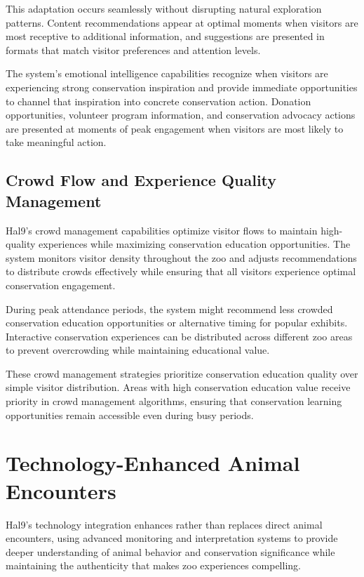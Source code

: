 \documentclass[
  Letterpaper,
]{scrbook}
\begin{document}
This adaptation occurs seamlessly without disrupting natural exploration
patterns. Content recommendations appear at optimal moments when
visitors are most receptive to additional information, and suggestions
are presented in formats that match visitor preferences and attention
levels.

The system's emotional intelligence capabilities recognize when visitors
are experiencing strong conservation inspiration and provide immediate
opportunities to channel that inspiration into concrete conservation
action. Donation opportunities, volunteer program information, and
conservation advocacy actions are presented at moments of peak
engagement when visitors are most likely to take meaningful action.

\subsection{Crowd Flow and Experience Quality
Management}\label{crowd-flow-and-experience-quality-management}

Hal9's crowd management capabilities optimize visitor flows to maintain
high-quality experiences while maximizing conservation education
opportunities. The system monitors visitor density throughout the zoo
and adjusts recommendations to distribute crowds effectively while
ensuring that all visitors experience optimal conservation engagement.

During peak attendance periods, the system might recommend less crowded
conservation education opportunities or alternative timing for popular
exhibits. Interactive conservation experiences can be distributed across
different zoo areas to prevent overcrowding while maintaining
educational value.

These crowd management strategies prioritize conservation education
quality over simple visitor distribution. Areas with high conservation
education value receive priority in crowd management algorithms,
ensuring that conservation learning opportunities remain accessible even
during busy periods.

\section{Technology-Enhanced Animal
Encounters}\label{technology-enhanced-animal-encounters}

Hal9's technology integration enhances rather than replaces direct
animal encounters, using advanced monitoring and interpretation systems
to provide deeper understanding of animal behavior and conservation
significance while maintaining the authenticity that makes zoo
experiences compelling.
\end{document}
